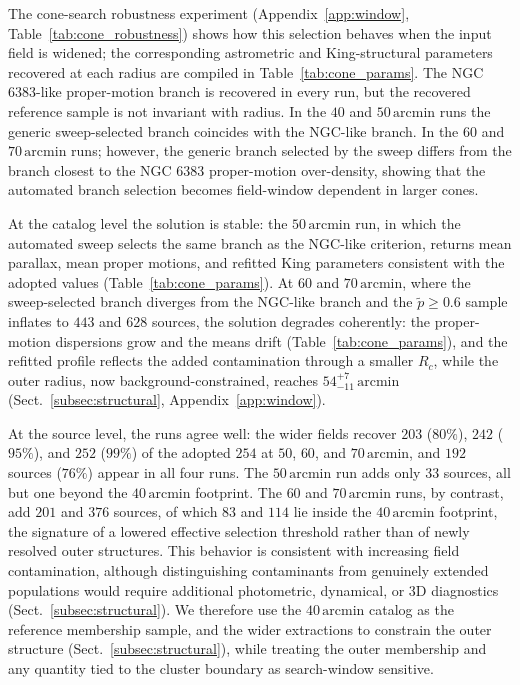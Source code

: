 \documentclass{aa}
\begin{document}
The cone-search robustness experiment (Appendix~\ref{app:window}, Table~\ref{tab:cone_robustness}) shows how this selection behaves when the input field is widened; the corresponding astrometric and King-structural parameters recovered at each radius are compiled in Table~\ref{tab:cone_params}. The NGC 6383-like proper-motion branch is recovered in every run, but the recovered reference sample is not invariant with radius. In the $40$ and $50\,\mathrm{arcmin}$ runs the generic sweep-selected branch coincides with the NGC-like branch. In the $60$ and $70\,\mathrm{arcmin}$ runs; however, the generic branch selected by the sweep differs from the branch closest to the NGC 6383 proper-motion over-density, showing that the automated branch selection becomes field-window dependent in larger cones.

At the catalog level the solution is stable: the $50\,\mathrm{arcmin}$ run, in which the automated sweep selects the same branch as the NGC-like criterion, returns mean parallax, mean proper motions, and refitted King parameters consistent with the adopted values (Table~\ref{tab:cone_params}). At $60$ and $70\,\mathrm{arcmin}$, where the sweep-selected branch diverges from the NGC-like branch and the $\tilde{p}\geq0.6$ sample inflates to $443$ and $628$ sources, the solution degrades coherently: the proper-motion dispersions grow and the means drift (Table~\ref{tab:cone_params}), and the refitted profile reflects the added contamination through a smaller $R_c$, while the outer radius, now background-constrained, reaches $54^{+7}_{-11}\,\mathrm{arcmin}$ (Sect.~\ref{subsec:structural}, Appendix~\ref{app:window}).

At the source level, the runs agree well: the wider fields recover $203$ ($80\%$), $242$ ($95\%$), and $252$ ($99\%$) of the adopted $254$ at $50$, $60$, and $70\,\mathrm{arcmin}$, and $192$ sources ($76\%$) appear in all four runs. The $50\,\mathrm{arcmin}$ run adds only $33$ sources, all but one beyond the $40\,\mathrm{arcmin}$ footprint. The $60$ and $70\,\mathrm{arcmin}$ runs, by contrast, add $201$ and $376$ sources, of which $83$ and $114$ lie inside the $40\,\mathrm{arcmin}$ footprint, the signature of a lowered effective selection threshold rather than of newly resolved outer structures. This behavior is consistent with increasing field contamination, although distinguishing contaminants from genuinely extended populations would require additional photometric, dynamical, or 3D diagnostics (Sect.~\ref{subsec:structural}). We therefore use the $40\,\mathrm{arcmin}$ catalog as the reference membership sample, and the wider extractions to constrain the outer structure (Sect.~\ref{subsec:structural}), while treating the outer membership and any quantity tied to the cluster boundary as search-window sensitive.
\end{document}
